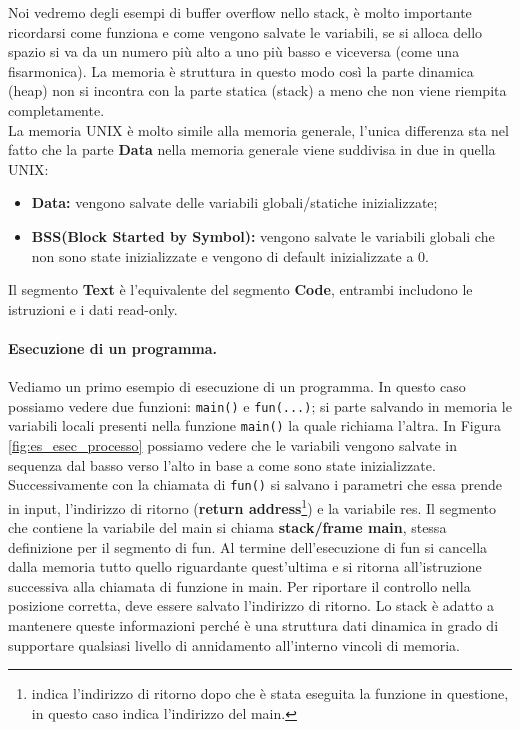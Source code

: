 Noi vedremo degli esempi di buffer overflow nello stack, è molto importante ricordarsi
come funziona e come vengono salvate le variabili, se si alloca dello spazio si va da
un numero più alto a uno più basso e viceversa (come una fisarmonica). La memoria è
struttura in questo modo così la parte dinamica (heap) non si incontra con la parte
statica (stack) a meno che non viene riempita completamente.\\
La memoria UNIX è molto simile alla memoria generale, l'unica differenza sta nel
fatto che la parte \textbf{Data} nella memoria generale viene suddivisa in due in
quella UNIX:

\begin{itemize}
    \item \textbf{Data:} vengono salvate delle variabili globali/statiche
          inizializzate;
    \item \textbf{BSS(Block Started by Symbol):} vengono salvate le variabili globali
          che non sono state inizializzate e vengono di default inizializzate a 0.
\end{itemize}

Il segmento \textbf{Text} è l'equivalente del segmento \textbf{Code}, entrambi
includono le istruzioni e i dati read-only.

\paragraph{Esecuzione di un programma.}
Vediamo un primo esempio di esecuzione di un programma.
In questo caso possiamo vedere due funzioni: \verb|main()| e \verb|fun(...)|; si parte
salvando in memoria le variabili locali presenti nella funzione \verb|main()| la
quale richiama l'altra. In Figura \ref{fig:es_esec_processo} possiamo vedere che le
variabili vengono salvate in sequenza dal basso verso l'alto in base a come sono state
inizializzate. Successivamente con la chiamata di \verb|fun()| si salvano i parametri
che essa prende in input, l'indirizzo di
ritorno (\textbf{return address}\footnote{indica l'indirizzo di ritorno dopo che è
    stata eseguita la funzione in questione, in questo caso indica l'indirizzo del main.})
e la variabile res. Il segmento che contiene la variabile del main si
chiama \textbf{stack/frame main}, stessa definizione per il segmento di fun.
Al termine dell'esecuzione di fun si cancella dalla memoria tutto quello riguardante
quest'ultima e si ritorna all'istruzione successiva alla chiamata di funzione in main.
Per riportare il controllo nella posizione corretta, deve essere salvato l'indirizzo
di ritorno. Lo stack è adatto a mantenere queste informazioni perché è una struttura
dati dinamica in grado di supportare qualsiasi livello di annidamento all'interno
vincoli di memoria.


